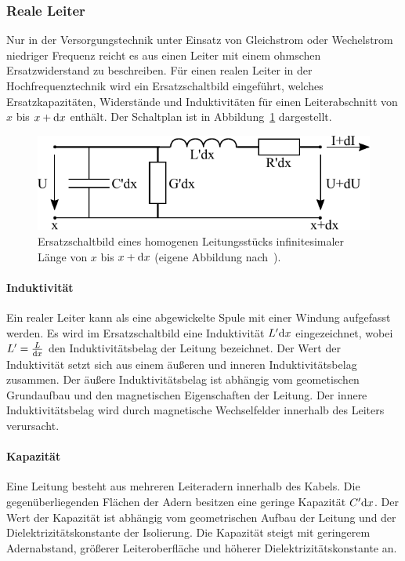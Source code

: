 \documentclass[a4paper,twoside,final]{article}
\begin{document}
\subsubsection{Reale Leiter}
Nur in der Versorgungstechnik unter Einsatz von Gleichstrom oder Wechelstrom niedriger Frequenz reicht es aus einen Leiter mit einem ohmschen Ersatzwiderstand zu beschreiben. Für einen realen Leiter in der Hochfrequenztechnik wird ein Ersatzschaltbild eingeführt, welches Ersatzkapazitäten, Widerstände und Induktivitäten für einen Leiterabschnitt von $x$ bis $x+\mathrm{d} x$ enthält. Der Schaltplan ist in Abbildung~\ref{fig:Ersatzschaltbild} dargestellt.
\begin{figure}[htp]
    \centering
    \includegraphics{Schaltungen/Ersatzschaltbild.pdf}
    \caption{Ersatzschaltbild eines homogenen Leitungsstücks infinitesimaler Länge von $x$ bis $x+\mathrm{d} x$ (eigene Abbildung nach~\cite{Perner}).}
    \label{fig:Ersatzschaltbild}
\end{figure}
\paragraph{Induktivität} Ein realer Leiter kann als eine abgewickelte Spule mit einer Windung aufgefasst werden. Es wird im Ersatzschaltbild eine Induktivität $L'\mathrm{d} x$ eingezeichnet, wobei $L' = \frac{L}{\mathrm{d} x}$ den Induktivitätsbelag der Leitung bezeichnet. Der Wert der Induktivität setzt sich aus einem äußeren und inneren Induktivitätsbelag zusammen. Der äußere Induktivitätsbelag ist abhängig vom geometischen Grundaufbau und den magnetischen Eigenschaften der Leitung. Der innere Induktivitätsbelag wird durch magnetische Wechselfelder innerhalb des Leiters verursacht.
\paragraph{Kapazität} Eine Leitung besteht aus mehreren Leiteradern innerhalb des Kabels. Die gegenüberliegenden Flächen der Adern besitzen eine geringe Kapazität $C'\mathrm{d} x$. Der Wert der Kapazität ist abhängig vom geometrischen Aufbau der Leitung und der Dielektrizitätskonstante der Isolierung. Die Kapazität steigt mit geringerem Adernabstand, größerer Leiteroberfläche und höherer Dielektrizitätskonstante an.
\end{document}
